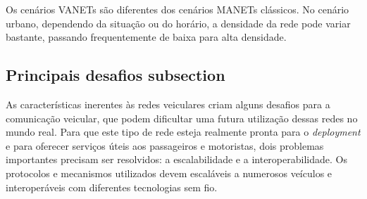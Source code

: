 Os cenários VANETs são diferentes dos cenários MANETs clássicos. No cenário
urbano, dependendo da situação ou do horário, a densidade da rede pode variar
bastante, passando frequentemente de baixa para alta densidade.

\subsection{Principais desafios subsection} %
\label{sub:principais_desafios_subsection}

As características inerentes às redes veiculares criam alguns desafios para a
comunicação veicular, que podem dificultar uma futura utilização dessas redes no
mundo real. Para que este tipo de rede esteja realmente pronta para o
\textit{deployment} e para oferecer serviços úteis aos passageiros e
motoristas, dois problemas importantes precisam ser resolvidos: a
escalabilidade e a interoperabilidade. Os protocolos e mecanismos utilizados
devem escaláveis a numerosos veículos e interoperáveis com diferentes
tecnologias sem fio.


